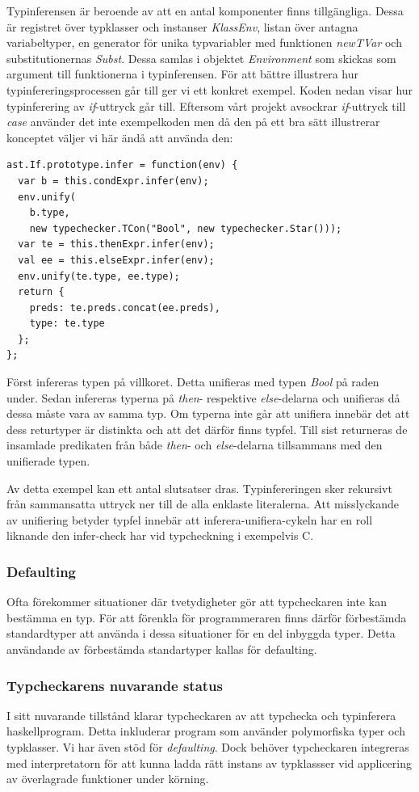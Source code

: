 Typinferensen är beroende av att en antal komponenter finns tillgängliga. Dessa är registret över typklasser och instanser \emph{KlassEnv}, listan över antagna variabeltyper, en generator för unika typvariabler med funktionen \emph{newTVar} och substitutionernas \emph{Subst}. Dessa samlas i objektet \emph{Environment} som skickas som argument till funktionerna i typinferensen. 
För att bättre illustrera hur typinfereringsprocessen går till ger vi ett konkret exempel. Koden nedan visar hur typinferering av \emph{if}-uttryck går till. Eftersom vårt projekt avsockrar \emph{if}-uttryck till \emph{case} använder det inte exempelkoden men då den på ett bra sätt illustrerar konceptet väljer vi här ändå att använda den:

\begin{lstlisting}
ast.If.prototype.infer = function(env) {
  var b = this.condExpr.infer(env);
  env.unify(
    b.type,
    new typechecker.TCon("Bool", new typechecker.Star()));
  var te = this.thenExpr.infer(env);
  val ee = this.elseExpr.infer(env);
  env.unify(te.type, ee.type);
  return {
    preds: te.preds.concat(ee.preds),
    type: te.type
  };
};
\end{lstlisting}
Först infereras typen på villkoret. Detta unifieras med typen \emph{Bool} på raden under. Sedan infereras typerna på \emph{then}- respektive \emph{else}-delarna och unifieras då dessa måste vara av samma typ. Om typerna inte går att unifiera innebär det att dess returtyper är distinkta och att det därför finns typfel. Till sist returneras de insamlade predikaten från både \emph{then}- och \emph{else}-delarna tillsammans med den unifierade typen.

Av detta exempel kan ett antal slutsatser dras. Typinfereringen sker rekursivt från sammansatta uttryck ner till de alla enklaste literalerna. Att misslyckande av unifiering betyder typfel innebär att inferera-unifiera-cykeln har en roll liknande den infer-check har vid typcheckning i exempelvis C.

\subsubsection{Defaulting}
Ofta förekommer situationer där tvetydigheter gör att typcheckaren inte kan bestämma en typ. För att förenkla för programmeraren finns därför förbestämda standardtyper att använda i dessa situationer för en del inbyggda typer. Detta användande av förbestämda standartyper kallas för defaulting.

\subsubsection{Typcheckarens nuvarande status}
I sitt nuvarande tillstånd klarar typcheckaren av att typchecka och typinferera haskellprogram. Detta inkluderar program som använder polymorfiska typer och typklasser. Vi har även stöd för \emph{defaulting}. Dock behöver typcheckaren integreras med interpretatorn för att kunna ladda rätt instans av typklassser vid applicering av överlagrade funktioner under körning.

